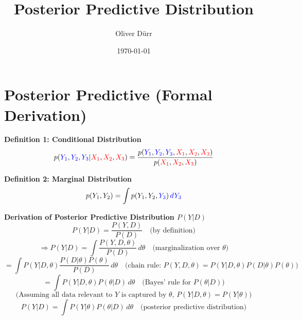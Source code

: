 \documentclass[11pt]{article}
\title{Posterior Predictive Distribution}
\author{Oliver Dürr}
\date{\today}
\begin{document}
  

\maketitle

\section*{Posterior Predictive (Formal Derivation)}

\textbf{Definition 1: Conditional Distribution} \\

\[
p(\textcolor{blue}{Y_1}, \textcolor{blue}{Y_2}, \textcolor{blue}{Y_3} | \textcolor{red}{X_1}, \textcolor{red}{X_2}, \textcolor{red}{X_3}) = \frac{p(\textcolor{blue}{Y_1}, \textcolor{blue}{Y_2}, \textcolor{blue}{Y_3}, \textcolor{red}{X_1}, \textcolor{red}{X_2}, \textcolor{red}{X_3})}{p(\textcolor{red}{X_1}, \textcolor{red}{X_2}, \textcolor{red}{X_3})}
\]

\textbf{Definition 2: Marginal Distribution} \\

\[
p(Y_1, Y_2) = \int p(Y_1, Y_2, \textcolor{blue}{Y_3}) \, \textcolor{blue}{dY_3}
\]

\textbf{Derivation of Posterior Predictive Distribution \(P(Y | D)\)} \\
\[
P(Y | D) = \frac{P(Y, D)}{P(D)} \quad \text{(by definition)}
\]
\[
\Rightarrow P(Y | D) = \int \frac{P(Y, D, \theta)}{P(D)} \, d\theta \quad \text{(marginalization over } \theta\text{)}
\]
\[
= \int P(Y | D, \theta) \frac{P(D | \theta) P(\theta)}{P(D)} \, d\theta \quad \text{(chain rule: } P(Y, D, \theta) = P(Y | D, \theta) P(D | \theta) P(\theta)\text{)}
\]
\[
= \int P(Y | D, \theta) P(\theta | D) \, d\theta \quad \text{(Bayes' rule for } P(\theta|D)\text{)}
\]
\[
\text{(Assuming all data relevant to } Y \text{ is captured by } \theta\text{, } P(Y | D, \theta) = P(Y | \theta)\text{)}
\]
\[
P(Y | D) = \int P(Y | \theta) P(\theta | D) \, d\theta \quad \text{(posterior predictive distribution)}
\]
\end{document}
